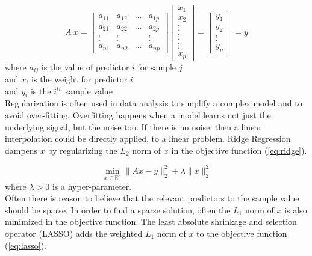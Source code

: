 \documentclass{article}
\begin{document}
\begin{equation} \label{eq:reg}
A ~x =
\begin{bmatrix}
    a_{11}       & a_{12} & \dots & a_{1p} \\
    a_{21}       & a_{22} & \dots & a_{2p} \\
    \vdots	    & \vdots  &          & \vdots  \\
    a_{n1}       & a_{n2} & \dots & a_{np}
\end{bmatrix} \begin{bmatrix}
    x_{1} \\
    x_{2} \\
    \vdots \\
    \vdots \\
    \vdots \\
    x_{p}
\end{bmatrix}=\begin{bmatrix}
    y_{1} \\
    y_{2} \\
    \vdots \\
    y_{n}
\end{bmatrix}
= y
\end{equation}
where $a_{ij}$ is the value of predictor $i$ for sample $j$\\
and $x_i$ is the weight for predictor $i$\\
and $y_i$ is the $i^{th}$ sample value\\

\quad Regularization is often used in data analysis to simplify a complex model and to avoid over-fitting. Overfitting happens when a model learns not just the underlying signal, but the noise too. If there is no noise, then a linear interpolation could be directly applied, to a linear problem. Ridge Regression dampens $x$ by regularizing the $L_2$ norm of $x$ in the objective function (\ref{eq:ridge}). 

\begin{equation} \label{eq:ridge}
\min_{x\in \mathbb{R}^p} \|Ax-y\|_2^2 + \lambda \|x\|_2^2
\end{equation}
where $\lambda>0$ is a hyper-parameter.\\

\quad Often there is reason to believe that the relevant predictors to the sample value should be sparse. In order to find a sparse solution, often the $L_1$ norm of $x$ is also minimized in the objective function. The least absolute shrinkage and selection operator (LASSO) adds the weighted $L_1$ norm of $x$ to the objective function (\ref{eq:lasso}). 
\end{document}
